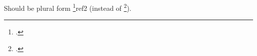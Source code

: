 \documentclass{article}
\begin{document}
Should be plural form \footcite{ref1}{ref2}
(instead of \footcites{ref1}{ref2}).
\end{document}
